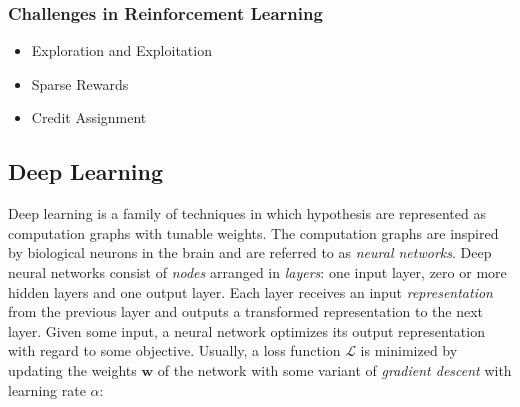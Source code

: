 

\subsubsection{Challenges in Reinforcement Learning}


\begin{itemize}
    \item Exploration and Exploitation
    \item Sparse Rewards
    \item Credit Assignment~\cite{minsky_cap_1961}
\end{itemize}


\subsection{Deep Learning}

Deep learning is a family of techniques in which hypothesis are represented as computation graphs with tunable weights.
The computation graphs are inspired by biological neurons in the brain and are referred to as \textit{neural networks}.
Deep neural networks consist of \textit{nodes} arranged in \textit{layers}: one input layer, zero or more hidden layers and one output layer.
Each layer receives an input \textit{representation}~\cite{bengio_representation_2014} from the previous layer and outputs a transformed representation to the next layer.
Given some input, a neural network optimizes its output representation with regard to some objective.
Usually, a loss function \(\mathcal{L}\) is minimized by updating the weights \(\mathbf{w}\) of the network with some variant of \textit{gradient descent} with learning rate \(\alpha\):

